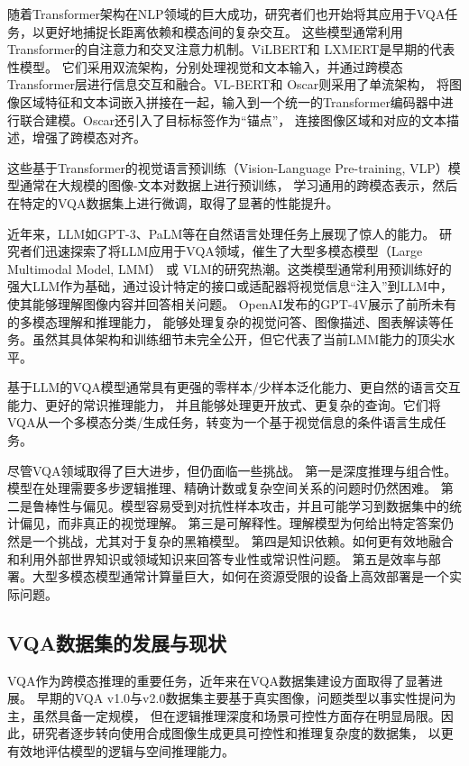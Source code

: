 随着Transformer架构在NLP领域的巨大成功，研究者们也开始将其应用于VQA任务，以更好地捕捉长距离依赖和模态间的复杂交互。
这些模型通常利用Transformer的自注意力和交叉注意力机制。ViLBERT\cite{lu2019vilbert}和 LXMERT\cite{tan2019lxmert}是早期的代表性模型。
它们采用双流架构，分别处理视觉和文本输入，并通过跨模态Transformer层进行信息交互和融合。VL-BERT\cite{su2019vl}和 Oscar\cite{li2020oscar}则采用了单流架构，
将图像区域特征和文本词嵌入拼接在一起，输入到一个统一的Transformer编码器中进行联合建模。Oscar还引入了目标标签作为“锚点”，
连接图像区域和对应的文本描述，增强了跨模态对齐。

这些基于Transformer的视觉语言预训练（Vision-Language Pre-training, VLP）模型通常在大规模的图像-文本对数据上进行预训练，
学习通用的跨模态表示，然后在特定的VQA数据集上进行微调，取得了显著的性能提升。

近年来，LLM如GPT-3、PaLM等在自然语言处理任务上展现了惊人的能力。
研究者们迅速探索了将LLM应用于VQA领域，催生了大型多模态模型（Large Multimodal Model, LMM） 或 
VLM的研究热潮。这类模型通常利用预训练好的强大LLM作为基础，通过设计特定的接口或适配器将视觉信息“注入”到LLM中，使其能够理解图像内容并回答相关问题。
OpenAI发布的GPT-4V\cite{openai2023gpt4v}展示了前所未有的多模态理解和推理能力，
能够处理复杂的视觉问答、图像描述、图表解读等任务。虽然其具体架构和训练细节未完全公开，但它代表了当前LMM能力的顶尖水平。

基于LLM的VQA模型通常具有更强的零样本/少样本泛化能力、更自然的语言交互能力、更好的常识推理能力，
并且能够处理更开放式、更复杂的查询。它们将VQA从一个多模态分类/生成任务，转变为一个基于视觉信息的条件语言生成任务。

尽管VQA领域取得了巨大进步，但仍面临一些挑战。
第一是深度推理与组合性。模型在处理需要多步逻辑推理、精确计数或复杂空间关系的问题时仍然困难。
第二是鲁棒性与偏见。模型容易受到对抗性样本攻击，并且可能学习到数据集中的统计偏见，而非真正的视觉理解。
第三是可解释性。理解模型为何给出特定答案仍然是一个挑战，尤其对于复杂的黑箱模型。
第四是知识依赖。如何更有效地融合和利用外部世界知识或领域知识来回答专业性或常识性问题。
第五是效率与部署。大型多模态模型通常计算量巨大，如何在资源受限的设备上高效部署是一个实际问题。
\subsection{VQA数据集的发展与现状}
VQA作为跨模态推理的重要任务，近年来在VQA数据集建设方面取得了显著进展。
早期的VQA v1.0与v2.0数据集主要基于真实图像，问题类型以事实性提问为主，虽然具备一定规模，
但在逻辑推理深度和场景可控性方面存在明显局限。因此，研究者逐步转向使用合成图像生成更具可控性和推理复杂度的数据集，
以更有效地评估模型的逻辑与空间推理能力。

